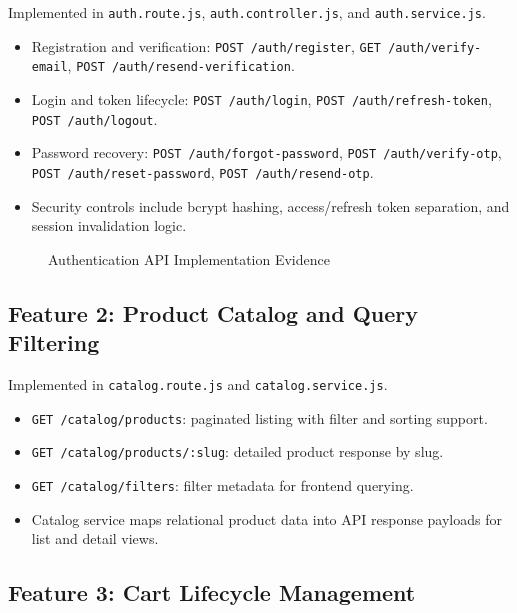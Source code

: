 Implemented in \texttt{auth.route.js}, \texttt{auth.controller.js}, and \texttt{auth.service.js}.
\begin{itemize}
    \item Registration and verification:
    \texttt{POST /auth/register}, \texttt{GET /auth/verify-email}, \texttt{POST /auth/resend-verification}.
    \item Login and token lifecycle:
    \texttt{POST /auth/login}, \texttt{POST /auth/refresh-token}, \texttt{POST /auth/logout}.
    \item Password recovery:
    \texttt{POST /auth/forgot-password}, \texttt{POST /auth/verify-otp}, \texttt{POST /auth/reset-password}, \texttt{POST /auth/resend-otp}.
    \item Security controls include bcrypt hashing, access/refresh token separation, and session invalidation logic.
\end{itemize}

\begin{figure}[H]
\centering
{}
\caption{Authentication API Implementation Evidence}
\label{fig:impl-auth-evidence}
\end{figure}

\subsection{Feature 2: Product Catalog and Query Filtering}

Implemented in \texttt{catalog.route.js} and \texttt{catalog.service.js}.
\begin{itemize}
    \item \texttt{GET /catalog/products}: paginated listing with filter and sorting support.
    \item \texttt{GET /catalog/products/:slug}: detailed product response by slug.
    \item \texttt{GET /catalog/filters}: filter metadata for frontend querying.
    \item Catalog service maps relational product data into API response payloads for list and detail views.
\end{itemize}

\subsection{Feature 3: Cart Lifecycle Management}

